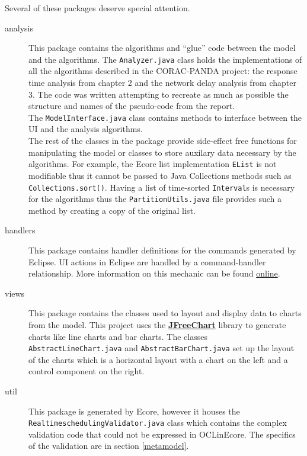 Several of these packages deserve special attention.
\begin{description}
    \item[analysis] This package contains the algorithms and ``glue'' code between the model and the
    algorithms. The \texttt{Analyzer.java} class holds the implementations of all the algorithms
    described in the CORAC-PANDA project: the response time analysis from chapter 2 and the
    network delay analysis from chapter 3. The code was written attempting to recreate as much
    as possible the structure and names of the pseudo-code from the report. 
    \\
    The \texttt{ModelInterface.java} class contains methods to interface between the UI and the
    analysis algorithms.
    \\
    The rest of the classes in the package provide side-effect free functions for manipulating
    the model or classes to store auxilary data necessary by the algorithms.
    For example, the Ecore list implementation \texttt{EList} is not modifiable
    thus it cannot be passed to Java Collections methods such as \texttt{Collections.sort()}.
    Having a list of time-sorted \texttt{Interval}s is necessary for the algorithms thus
    the \texttt{PartitionUtils.java} file provides such a method by creating a copy of the original
    list.
    \item[handlers] This package contains handler definitions for the commands generated by
    Eclipse. UI actions in Eclipse are handled by a command-handler relationship. More information
    on this mechanic can be found \href{http://help.eclipse.org/mars/index.jsp?topic=%2Forg.eclipse.platform.doc.isv%2Fguide%2Fworkbench_cmd_handlers.htm}{online}.
    \item[views] This package contains the classes used to layout and display data to charts from 
    the model. This project uses the \href{http://www.jfree.org/jfreechart/}{\textbf{JFreeChart}}
    library to generate charts like line charts and bar charts. The classes \texttt{AbstractLineChart.java} 
    and \texttt{AbstractBarChart.java} set up the layout of the charts which is a horizontal layout
    with a chart on the left and a control component on the right. 
    \item[util] This package is generated by Ecore, however it houses the \texttt{RealtimeschedulingValidator.java} 
    class which contains the complex validation code that could not be expressed in OCLinEcore. The specifics
    of the validation are in section \ref{metamodel}.
\end{description}

